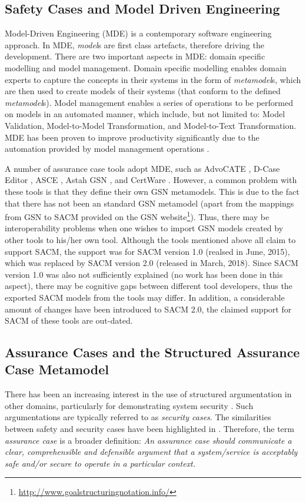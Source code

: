 \subsection{Safety Cases and Model Driven Engineering}
Model-Driven Engineering (MDE) is a contemporary software engineering approach. 
In MDE, \textit{model}s are first class artefacts, therefore driving the development. 
There are two important aspects in MDE: domain specific modelling and model management. 
Domain specific modelling enables domain experts to capture the concepts in their systems in the form of \textit{metamodel}s, which are then used to create models of their systems (that conform to the defined \textit{metamodel}s). 
Model management enables a series of operations to be performed on models in an automated manner, which include, but not limited to: Model Validation, Model-to-Model Transformation, and Model-to-Text Transformation.
MDE has been proven to improve productivity significantly due to the automation provided by model management operations \cite{jaaksi2002developing, karna2009evaluating}. 

A number of assurance case tools adopt MDE, such as AdvoCATE \cite{denney2017tool}, D-Case Editor \cite{matsuno2010dependability}, ASCE \cite{netkachova2014tool}, Astah GSN \cite{larrucea2017supporting}, and CertWare \cite{barry2011certware}. 
However, a common problem with these tools is that they define their own GSN metamodels. 
This is due to the fact that there has not been an standard GSN metamodel (apart from the mappings from GSN to SACM provided on the GSN website\footnote{\url{http://www.goalstructuringnotation.info/}}).
Thus, there may be interoperability problems when one wishes to import GSN models created by other tools to his/her own tool. 
Although the tools mentioned above all claim to support SACM, the support was for SACM version 1.0 (realsed in June, 2015), which was replaced by SACM version 2.0 (released in March, 2018).
Since SACM version 1.0 was also not sufficiently explained (no work has been done in this aspect), there may be cognitive gaps between different tool developers, thus the exported SACM models from the tools may differ.
In addition, a considerable amount of changes have been introduced to SACM 2.0, the claimed support for SACM of these tools are out-dated. 

\subsection{Assurance Cases and the Structured Assurance Case Metamodel}
There has been an increasing interest in the use of structured argumentation in other domains, particularly for demonstrating system security \cite{bloomfield2010safety}. 
Such argumentations are typically referred to as \textit{security cases}. 
The similarities between safety and security cases have been highlighted in \cite{lautieri2005safsec}. 
Therefore, the term \textit{assurance case} is a broader definition: \textit{An assurance case should communicate a clear, comprehensible and defensible argument that a system/service is acceptably safe and/or secure to operate in a particular context.} 

